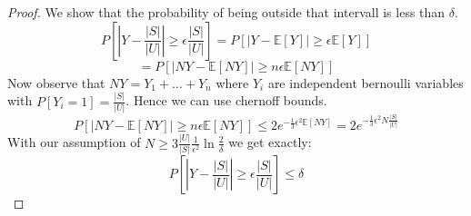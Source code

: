 \begin{proof}
	We show that the probability of being outside that intervall is less than $\delta$.
	$$P\left[\left|Y - \frac{|S|}{|U|}\right| \geq \epsilon \frac{|S|}{|U|}\right] = P\left[\left|Y - \mathbb{E}[Y]\right| \geq \epsilon \mathbb{E}[Y]\right]$$
	$$ = P[|NY - \mathbb{E}[NY]| \geq n \epsilon \mathbb{E}[NY]]$$
	Now observe that $NY = Y_1 + \dots + Y_n$ where $Y_i$ are independent bernoulli variables with $P[Y_i=1] = \frac{|S|}{|U|}$. Hence we can use chernoff bounds.
	$$P[|NY - \mathbb{E}[NY]| \geq n \epsilon \mathbb{E}[NY]] \leq 2 e^{-\frac{1}{3} \epsilon^2 \mathbb{E}[NY]} =  2 e^{-\frac{1}{3} \epsilon^2 N \frac{|S|}{|U|}}$$
	With our assumption of $N \geq 3 \frac{|U|}{|S|} \frac{1}{\epsilon^2} \ln \frac{2}{\delta}$ we get exactly:
	$$P\left[\left|Y - \frac{|S|}{|U|}\right| \geq \epsilon \frac{|S|}{|U|}\right] \leq \delta$$
\end{proof}